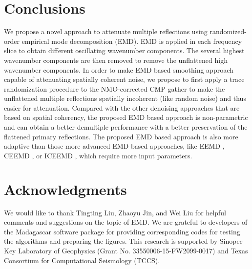 \section{Conclusions}
We propose a novel approach to attenuate multiple reflections using randomized-order empirical mode decomposition (EMD). EMD is applied in each frequency slice to obtain different oscillating wavenumber components. The several highest wavenumber components are then removed to remove the unflattened high wavenumber components. In order to make EMD based smoothing approach capable of attenuating spatially coherent noise, we propose to first apply a trace randomization procedure to the NMO-corrected CMP gather to make the unflattened multiple reflections spatially incoherent (like random noise) and thus easier for attenuation. Compared with the other denoising approaches that are based on spatial coherency, the proposed EMD based approach is non-parametric and can obtain a better demultiple performance with a better preservation of the flattened primary reflections. The proposed EMD based approach is also more adaptive than those more advanced EMD based approaches, like EEMD \cite{eemd}, CEEMD \cite{epsceemd}, or ICEEMD \cite{iceemd2014}, which require more input parameters.

\section{Acknowledgments}
We would like to thank Tingting Liu, Zhaoyu Jin, and Wei Liu for helpful comments and suggestions on the topic of EMD. We are grateful to developers of the Madagascar software package for providing corresponding codes for testing the algorithms and preparing the figures. This research is supported by Sinopec Key Laboratory of Geophysics (Grant No. 33550006-15-FW2099-0017) and Texas Consortium for Computational Seismology (TCCS).











